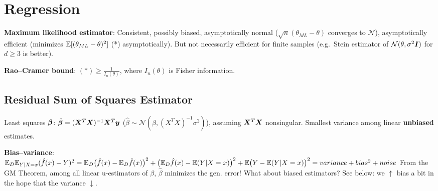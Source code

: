 \section{Regression}

\textbf{Maximum likelihood estimator}:
Consistent,
possibly biased,
asymptotically normal ($\sqrt{n}(\theta_{ML} - \theta)$ converges to $\mathcal{N}$),
asymptotically efficient (minimizes $\mathbb E[(\theta_{ML} - \theta)^2]$ (*) asymptotically).
But not necessarily efficient for finite samples
(e.g.\ Stein estimator of $\mathcal{N}(\theta, \sigma^2 \boldsymbol{I})$ for $d\geq 3$ is better).

\textbf{Rao--Cramer bound}: $(*) \geq \frac{1}{I_n(\theta)}$,
where $I_n(\theta)$ is Fisher information.



\subsection*{Residual Sum of Squares Estimator}
Least squares $\boldsymbol{\beta}$:
$\hat{\boldsymbol{\beta}} = (\boldsymbol{X}^T\boldsymbol{X})^{-1}\boldsymbol{X}^T \boldsymbol{y}$ ($\hat{\beta} \sim \mathcal{N}(\beta,(X^TX)^{-1}\sigma^2)$),
assuming $\boldsymbol{X}^T\boldsymbol{X}$ nonsingular.
Smallest variance among linear \textbf{unbiased} estimates.

\textbf{Bias--variance}:
$\mathbb E_D \mathbb E_{Y | X=x}(\hat{f}(x) - Y)^2
=
\mathbb E_D \big(\hat{f}(x) - \mathbb E_D \hat{f}(x) \big)^2
+ \big( \mathbb E_D \hat{f}(x) - \mathbb E(Y | X=x) \big)^2
+ \mathbb E \big(Y - \mathbb E(Y | X=x) \big)^2
=
variance + bias^2 + noise
$
From the GM Theorem, among all linear u-estimators of $\beta$, $\hat \beta$ minimizes the gen. error! What about biased estimators? See below: we $\uparrow$ bias a bit in the hope that the variance $\downarrow$.


